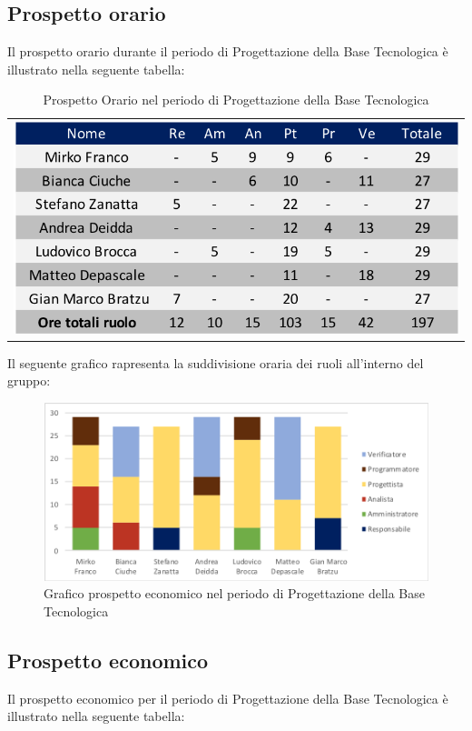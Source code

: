\subsection{Prospetto orario}
Il prospetto orario durante il periodo di Progettazione della Base Tecnologica è illustrato nella seguente tabella:

\begin{table}[!ht]
	\begin{center}
		\begin{tabular}{c}
			\includegraphics{images/tabellaProgettazioneTecnologica.png}
		\end{tabular}
		\caption{Prospetto Orario nel periodo di Progettazione della Base Tecnologica}
	\end{center}
\end{table}

Il seguente grafico rapresenta la suddivisione oraria dei ruoli all'interno del gruppo:
\begin{figure}[!ht]
	\begin{center}
		\includegraphics[scale=0.80]{images/grafoProgettazioneTecnologica.png}
		\caption{Grafico prospetto economico nel periodo di Progettazione della Base Tecnologica}
	\end{center}
\end{figure}
\newpage
\subsection{Prospetto economico}
Il prospetto economico per il periodo di Progettazione della Base Tecnologica è illustrato nella seguente tabella:

